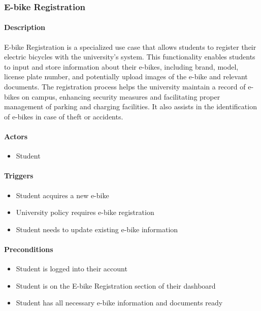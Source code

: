 \subsubsection{E-bike Registration}

\paragraph{Description}
E-bike Registration is a specialized use case that allows students to register their electric bicycles with the university's system. This functionality enables students to input and store information about their e-bikes, including brand, model, license plate number, and potentially upload images of the e-bike and relevant documents. The registration process helps the university maintain a record of e-bikes on campus, enhancing security measures and facilitating proper management of parking and charging facilities. It also assists in the identification of e-bikes in case of theft or accidents.

\paragraph{Actors}
\begin{itemize}
    \item Student
\end{itemize}

\paragraph{Triggers}
\begin{itemize}
    \item Student acquires a new e-bike
    \item University policy requires e-bike registration
    \item Student needs to update existing e-bike information
\end{itemize}

\paragraph{Preconditions}
\begin{itemize}
    \item Student is logged into their account
    \item Student is on the E-bike Registration section of their dashboard
    \item Student has all necessary e-bike information and documents ready
\end{itemize}


